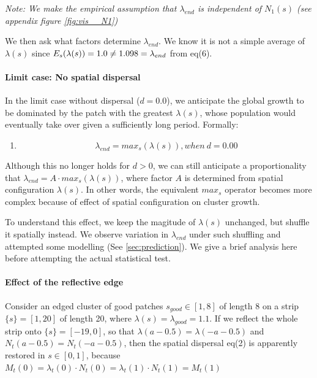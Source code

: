 \documentclass[a4paperpaper,]{article}
\providecommand{\tightlist}{%
  \setlength{\itemsep}{0pt}\setlength{\parskip}{0pt}}
\let\oldparagraph\paragraph
\renewcommand{\paragraph}[1]{\oldparagraph{#1}\mbox{}}
\begin{document}
\emph{Note: We make the empirical assumption that \(\lambda_{end}\) is
independent of \(N_1(s)\) (see appendix figure \ref{fig:vis__N1})}

We then ask what factors determine \(\lambda_{end}\). We know it is not
a simple average of \(\lambda(s)\) since
\(E_s(\lambda(s))=1.0\neq 1.098 = \lambda_{end}\) from eq(6).

\paragraph{Limit case: No spatial
dispersal}\label{limit-case-no-spatial-dispersal}

In the limit case without dispersal (\(d = 0.0\)), we anticipate the
global growth to be dominated by the patch with the greatest
\(\lambda(s)\), whose population would eventually take over given a
sufficiently long period. Formally:

\begin{enumerate}
\def\labelenumi{(\arabic{enumi})}
\setcounter{enumi}{6}
\tightlist
\item
  \[
  \lambda_{end} = max_s(\lambda(s)), when ~d=0.00 
  \]
\end{enumerate}

Although this no longer holds for \(d>0\), we can still anticipate a
proportionality that \(\lambda_{end}= A \cdot max_s(\lambda(s))\), where
factor \(A\) is determined from spatial configuration \(\lambda(s)\). In
other words, the equivalent \(max_s\) operator becomes more complex
because of effect of spatial configuration on cluster growth.

To understand this effect, we keep the magitude of \(\lambda(s)\)
unchanged, but shuffle it spatially instead. We observe variation in
\(\lambda_{end}\) under such shuffling and attempted some modelling (See
\ref{sec:prediction}). We give a brief analysis here before attempting
the actual statistical test.

\paragraph{Effect of the reflective
edge}\label{effect-of-the-reflective-edge}

Consider an edged cluster of good patches \(s_{good}\in[1,8]\) of length
8 on a strip \(\{s\}=[1,20]\) of length 20, where
\(\lambda(s)= \lambda_{good} = 1.1\). If we reflect the whole strip onto
\(\{s\}=[-19,0]\), so that \(\lambda(a-0.5)=\lambda(-a-0.5)\) and
\(N_t(a-0.5)=N_t(-a-0.5)\), then the spatial dispersal eq(2) is
apparently restored in \(s\in[0,1]\), because
\(M_t(0) = \lambda_t(0)\cdot N_t(0) = \lambda_t(1)\cdot N_t(1)=M_t(1)\)
\end{document}
